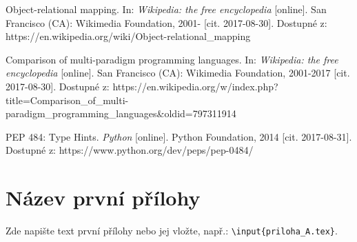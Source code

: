 \documentclass[a4paper,twoside,12pt]{scrbook}
\begin{document}
\begin{thebibliography}{99}

	 Object-relational mapping. In: \textit{Wikipedia: the free encyclopedia} [online]. San Francisco (CA): Wikimedia Foundation, 2001- [cit. 2017-08-30]. Dostupné z: https://en.wikipedia.org/wiki/Object-relational\_mapping

	 Comparison of multi-paradigm programming languages. In: \textit{Wikipedia: the free encyclopedia} [online]. San Francisco (CA): Wikimedia Foundation, 2001-2017 [cit. 2017-08-30]. Dostupné z: https://en.wikipedia.org/w/index.php?title=Comparison\_of\_multi-paradigm\_programming\_languages\&oldid=797311914

	 PEP 484: Type Hints. \textit{Python} [online]. Python Foundation, 2014 [cit. 2017-08-31]. Dostupné z: https://www.python.org/dev/peps/pep-0484/

\end{thebibliography}


\newpage %
\appendix %



\section{Název první přílohy}
%
Zde napište text první přílohy nebo jej vložte, např.: \texttt{\textbackslash input\{priloha\_A.tex\}}.
%
\end{document}
